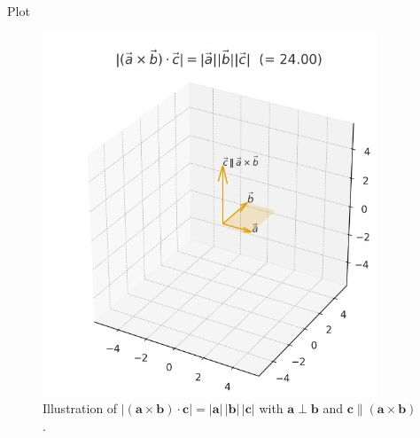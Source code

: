 \documentclass{beamer}
\theoremstyle{remark}
\let\vec\mathbf
\begin{document}
\begin{frame}{Plot}
     \begin{figure}[h!]
\centering
\includegraphics[width=0.5\linewidth]{figs/2.10.28.jpeg}
\caption{Illustration of $|( \vec a\times\vec b)\cdot\vec c|=|\vec a|\,|\vec b|\,|\vec c|$ with $\vec a\perp\vec b$ and $\vec c\parallel(\vec a\times\vec b)$.}


\end{figure}
\end{frame}
\end{document}
